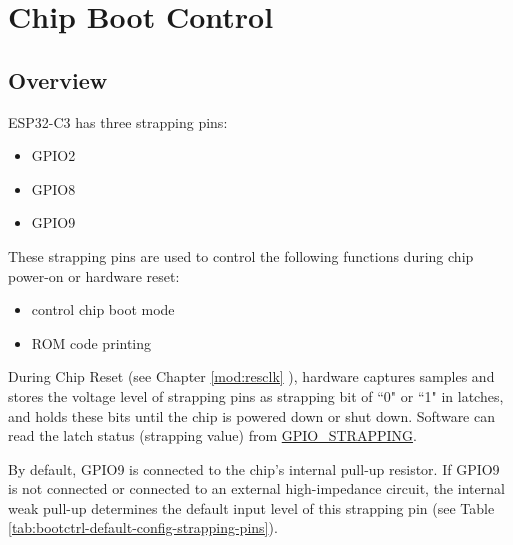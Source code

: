 \documentclass[main\_\_EN.tex]{subfiles}
\begin{document}

\ifglobal
\else
    {\let\clearpage\relax \listoftodos}
    \tableofcontents
\fi




\hypertarget{bootctrl}{}
\chapter{Chip Boot Control}
\label{mod:bootctrl}


\section{Overview}

ESP32-C3 has three strapping pins:
\begin{itemize}
    \item GPIO2
    \item GPIO8
    \item GPIO9
\end{itemize}

These strapping pins are used to control the following functions during chip power-on or hardware reset:
\begin{itemize}
    \item control chip boot mode
    \item ROM code printing
\end{itemize}

During Chip Reset (see Chapter \ref{mod:resclk} \textit{}), hardware captures samples and stores the voltage level of strapping pins as strapping bit of ``0" or ``1" in latches, and holds these bits until the chip is powered down or shut down. Software can read the latch status (strapping value) from \hyperref[fielddesc:GPIOSTRAPPING]{GPIO\_STRAPPING}.

By default, GPIO9 is connected to the chip's internal pull-up resistor. If GPIO9 is not connected or connected to an external high-impedance circuit, the internal weak pull-up determines the default input level of this strapping pin (see Table \ref{tab:bootctrl-default-config-strapping-pins}).
\end{document}
